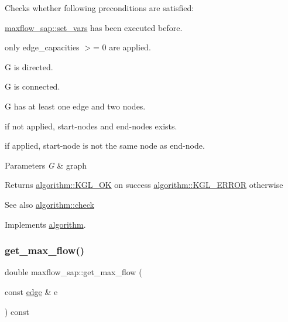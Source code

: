 Checks whether following preconditions are satisfied\+: 
\begin{DoxyItemize}
\item \mbox{\hyperlink{classmaxflow__sap_ac50ba0330c169c7ce697947a76702e13}{maxflow\+\_\+sap\+::set\+\_\+vars}} has been executed before. 
\item only edge\+\_\+capacities $>$= 0 are applied. 
\item {\ttfamily G} is directed. 
\item {\ttfamily G} is connected. 
\item {\ttfamily G} has at least one edge and two nodes. 
\item if not applied, start-\/nodes and end-\/nodes exists. 
\item if applied, start-\/node is not the same node as end-\/node. 
\end{DoxyItemize}


\begin{DoxyParams}{Parameters}
{\em G} & graph \\
\hline
\end{DoxyParams}
\begin{DoxyReturn}{Returns}
{\ttfamily \mbox{\hyperlink{classalgorithm_af1a0078e153aa99c24f9bdf0d97f6710aae4c1cd7fe8d8cf4b143241a6e7c31cf}{algorithm\+::\+K\+G\+L\+\_\+\+OK}}} on success {\ttfamily \mbox{\hyperlink{classalgorithm_af1a0078e153aa99c24f9bdf0d97f6710ae67bf27b2ef31f73e545a7f9f4a69556}{algorithm\+::\+K\+G\+L\+\_\+\+E\+R\+R\+OR}}} otherwise 
\end{DoxyReturn}
\begin{DoxySeeAlso}{See also}
\mbox{\hyperlink{classalgorithm_a05c0f25463eb35a77b2d73fc06bb2c0e}{algorithm\+::check}} 
\end{DoxySeeAlso}


Implements \mbox{\hyperlink{classalgorithm_a05c0f25463eb35a77b2d73fc06bb2c0e}{algorithm}}.

\mbox{\label{classmaxflow__sap_ae90889b16323a2af0ab13e04c87953a5}} 
\subsubsection{\texorpdfstring{get\+\_\+max\+\_\+flow()}{get\_max\_flow()}\hspace{0.1cm}{\footnotesize\ttfamily [1/2]}}
{\footnotesize\ttfamily double maxflow\+\_\+sap\+::get\+\_\+max\+\_\+flow (\begin{DoxyParamCaption}\item[{const \mbox{\hyperlink{classedge}{edge}} \&}]{e }\end{DoxyParamCaption}) const}

